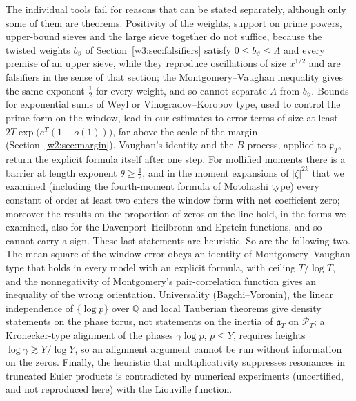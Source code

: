 \documentclass[11pt]{amsart}
\theoremstyle{definition}
\theoremstyle{remark}
\numberwithin{equation}{section}
\newcommand{\Q}{\mathbb{Q}}
\newcommand{\PT}{\mathcal{P}_T}                        %
\newcommand{\pT}{\mathfrak{p}_T}                       %
\newcommand{\aT}{\mathfrak{a}_T}                       %
\begin{document}
The individual tools fail for reasons that can be stated separately, although only some of them are theorems.
Positivity of the weights, support on prime powers, upper-bound sieves and the large sieve together do not
suffice, because the twisted weights $b_\vartheta$ of Section~\ref{w3:sec:falsifiers} satisfy
$0\le b_\vartheta\le\Lambda$ and every premise of an upper sieve, while they reproduce oscillations of size
$x^{1/2}$ and are falsifiers in the sense of that section; the Montgomery--Vaughan inequality gives the same
exponent $\frac12$ for every weight, and so cannot separate $\Lambda$ from $b_\vartheta$. Bounds for
exponential sums of Weyl or Vinogradov--Korobov type, used to control the prime form on the window, lead in
our estimates to error terms of size at least $2T\exp\big(e^{T}(1+o(1))\big)$, far above the scale of the
margin (Section~\ref{w2:sec:margin}). Vaughan's identity and the $B$-process, applied to $\pT$, return the
explicit formula itself after one step. For mollified moments there is a barrier at length exponent
$\theta\ge\frac12$, and in the moment expansions of $|\zeta|^{2k}$ that we examined (including the
fourth-moment formula of Motohashi type) every constant of order at least two enters the window form with net
coefficient zero; moreover the results on the proportion of zeros on the line hold, in the forms we examined,
also for the Davenport--Heilbronn and Epstein functions, and so cannot carry a sign. These last statements are
heuristic. So are the following two. The mean square of the window error obeys an identity of
Montgomery--Vaughan type that holds in every model with an explicit formula, with ceiling $T/\log T$, and the
nonnegativity of Montgomery's pair-correlation function \cite{Montgomery1973} gives an inequality of the
wrong orientation. Universality (Bagchi--Voronin), the linear independence of $\{\log p\}$ over $\Q$ and local
Tauberian theorems give density statements on the phase torus, not statements on the inertia of $\aT$ on
$\PT$; a Kronecker-type alignment of the phases $\gamma\log p$, $p\le Y$, requires heights
$\log\gamma\gtrsim Y/\log Y$, so an alignment argument cannot be run without information on the zeros.
Finally, the heuristic that multiplicativity suppresses resonances in truncated Euler products is contradicted
by numerical experiments (uncertified, and not reproduced here) with the Liouville function.
\end{document}
